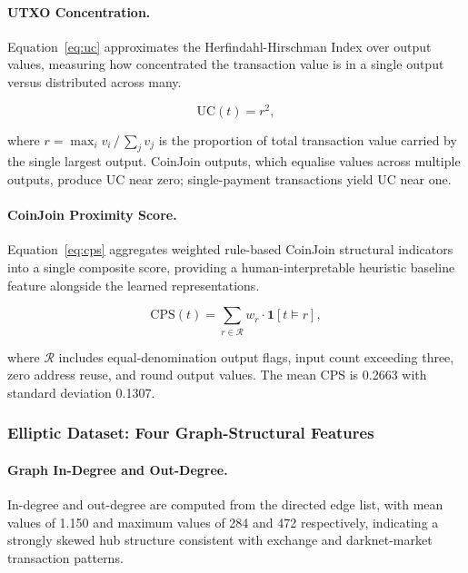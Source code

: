 \documentclass[12pt,a4paper]{article}
\begin{document}
\paragraph{UTXO Concentration.}
Equation~\eqref{eq:uc} approximates the Herfindahl-Hirschman
Index over output values, measuring how concentrated the
transaction value is in a single output versus distributed
across many.

\begin{equation}
  \text{UC}(t) = r^2,
  \label{eq:uc}
\end{equation}

where $r = \max_i v_i \,/\, \sum_j v_j$ is the proportion
of total transaction value carried by the single largest
output. CoinJoin outputs, which equalise values across
multiple outputs, produce UC near zero; single-payment
transactions yield UC near one.

\paragraph{CoinJoin Proximity Score.}
Equation~\eqref{eq:cps} aggregates weighted rule-based
CoinJoin structural indicators into a single composite
score, providing a human-interpretable heuristic baseline
feature alongside the learned representations.

\begin{equation}
  \text{CPS}(t) = \sum_{r \in \mathcal{R}} w_r
                  \cdot \mathbf{1}[t \models r],
  \label{eq:cps}
\end{equation}

where $\mathcal{R}$ includes equal-denomination output
flags, input count exceeding three, zero address reuse,
and round output values. The mean CPS is 0.2663 with
standard deviation 0.1307.

\subsubsection{Elliptic Dataset: Four Graph-Structural Features}

\paragraph{Graph In-Degree and Out-Degree.}
In-degree and out-degree are computed from the directed
edge list, with mean values of 1.150 and maximum values
of 284 and 472 respectively, indicating a strongly
skewed hub structure consistent with exchange and
darknet-market transaction patterns.
\end{document}
